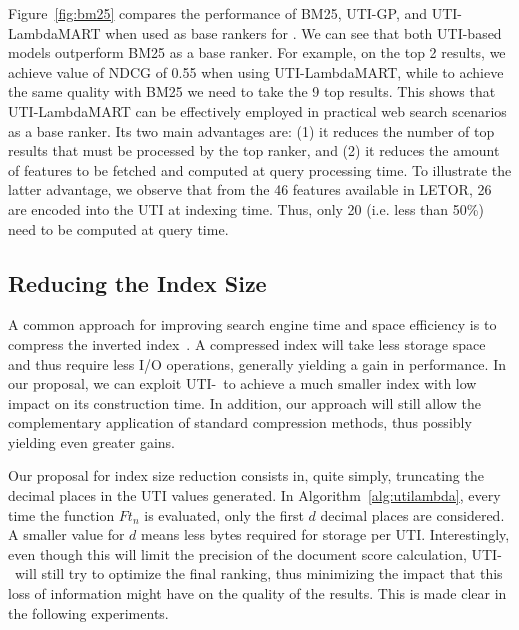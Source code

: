 \documentclass[preprint,review,10pt,3p]{elsarticle}
\begin{document}
Figure~\ref{fig:bm25} compares the
performance of BM25, UTI-GP, and UTI-LambdaMART when used as base rankers for \lambdamart.
We can see that both UTI-based models outperform BM25 as a base ranker. For example, on the top
2 results, we achieve value of NDCG of 0.55 when using
UTI-LambdaMART, while to achieve the same quality with BM25 we need to
take the 9 top results.
This shows that UTI-LambdaMART can be effectively employed 
in practical web search scenarios as a base ranker.
Its two main advantages are: (1)
it reduces the number of top results that must be processed by the top ranker, and (2) 
it reduces the amount of features to be fetched and computed at query processing time.
To illustrate the latter advantage, we observe that from the 46 features available in LETOR, 26 are encoded into the UTI at indexing time. Thus, only 20 (i.e. less than 50\%) need to be computed at query time.

\subsection{Reducing the Index Size}
\label{sec:compression}

A common approach for improving search engine time and space efficiency is to compress the inverted index~\cite{baezaribeiro2011modinforet}. A compressed index will take less storage space and thus require less I/O operations, generally yielding a gain in performance. In our proposal, we can exploit UTI-\lambdamart\ to achieve a much smaller index with low impact on its construction time. In addition, our approach will still allow the complementary application of standard compression methods, thus possibly yielding even greater gains.

Our proposal for index size reduction consists in, quite simply, truncating the decimal places in the UTI values generated. In Algorithm~\ref{alg:utilambda}, every time the function $Ft_n$ is evaluated, only the first $d$ decimal places are considered. A smaller value for $d$ means less bytes required for storage per UTI. Interestingly, even though this will limit the precision of the document score calculation, UTI-\lamdamart\ will still try to optimize the final ranking, thus minimizing the impact that this loss of information might have on the quality of the results. This is made clear in the following experiments.
\end{document}
